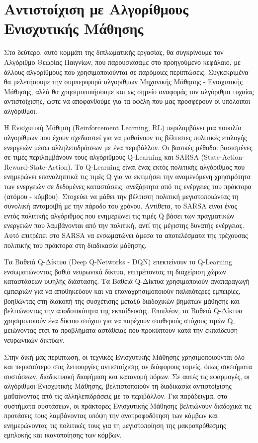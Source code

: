 \chapter{Αντιστοίχιση με Αλγορίθμους Ενισχυτικής Μάθησης}

Στο δεύτερο, αυτό κομμάτι της διπλωματικής εργασίας, θα συγκρίνουμε τον Αλγόριθμο Θεωρίας Παιγνίων, που παρουσιάσαμε στο προηγούμενο κεφάλαιο, με άλλους αλγορίθμους που χρησιμοποιούνται σε παρόμοιες περιπτώσεις. Συγκεκριμένα θα μελετήσουμε την συμπεριφορά αλγορίθμων Μηχανικής Μάθησης - Ενισχυτικής Μάθησης, αλλά θα χρησιμοποιήσουμε και ως σημείο αναφοράς τον αλγόριθμο τυχαίας αντιστοίχισης, ώστε να αποφανθούμε για τα οφέλη που μας προσφέρουν οι υπόλοιποι αλγόριθμοι.

Η Ενισχυτική Μάθηση (Reinforcement Learning, RL) περιλαμβάνει μια ποικιλία αλγορίθμων που έχουν σχεδιαστεί για να μαθαίνουν τις βέλτιστες πολιτικές επιλογής ενεργειών μέσω αλληλεπιδράσεων με ένα περιβάλλον. Οι βασικές μέθοδοι βασισμένες σε τιμές περιλαμβάνουν τους αλγόριθμους Q-Learning και SARSA (State-Action-Reward-State-Action). Το Q-Learning είναι ένας εκτός πολιτικής αλγόριθμος που ενημερώνει επαναληπτικά τις τιμές Q για να εκτιμήσει την αναμενόμενη χρησιμότητα των ενεργειών σε δεδομένες καταστάσεις, ανεξάρτητα από τις ενέργειες του πράκτορα (ατόμου - κόμβου). Στοχεύει να μάθει την βέλτιστη πολιτική μεγιστοποιώντας τη συνολική ανταμοιβή με την πάροδο του χρόνου. Αντίθετα, το SARSA είναι ένας εντός πολιτικής αλγόριθμος που ενημερώνει τις τιμές Q βάσει των πραγματικών ενεργειών που λαμβάνονται από την πολιτική, αντί της μέγιστης δυνατής ενέργειας. Αυτό επιτρέπει στο SARSA να ενσωματώνει άμεσα τα αποτελέσματα της τρέχουσας πολιτικής του πράκτορα στη διαδικασία μάθησης. 

Τα Βαθειά Q-Δίκτυα (Deep Q-Networks - DQN) επεκτείνουν το Q-Learning ενσωματώνοντας βαθιά νευρωνικά δίκτυα, επιτρέποντας τη διαχείριση χώρων καταστάσεων υψηλής διάστασης. Τα Βαθειά Q-Δίκτυα χρησιμοποιούν αναπαραγωγή εμπειριών για να αποθηκεύουν και να επαναχρησιμοποιούν παλαιότερες εμπειρίες, βοηθώντας στη διακοπή της συσχέτισης μεταξύ διαδοχικών βημάτων μάθησης και βελτιώνοντας την αποδοτικότητα της εκπαίδευσης. Επιπλέον, τα Βαθειά Q-Δίκτυα χρησιμοποιούν ένα δίκτυο στόχου για να παρέχουν σταθερούς στόχους τιμών Q, μειώνοντας έτσι τα προβλήματα αστάθειας που προκύπτουν κατά την εκπαίδευση νευρωνικών δικτύων. 

Στην δική μας περίπτωση, οι τεχνικές Ενισχυτικής Μάθησης χρησιμοποιούνται όλο και περισσότερο στις λειτουργίες αντιστοίχισης σε διάφορους τομείς, όπως συστήματα συστάσεων, διαδικτυακή διαφήμιση και κατανομή πόρων. Σε αυτές τις εφαρμογές, οι αλγόριθμοι Ενισχυτικής Μάθησης, βελτιστοποιούν τη διαδικασία αντιστοίχισης μαθαίνοντας από τις αλληλεπιδράσεις με το περιβάλλον. Για παράδειγμα, στα συστήματα συστάσεων, οι πράκτορες Ενισχυτικής Μάθησης βελτιώνουν διαδοχικά τις προτάσεις τους λαμβάνοντας υπόψη την ανατροφοδότηση των κόμβων και ενημερώνοντας τις πολιτικές τους για τη μεγιστοποίηση της μακροπρόθεσμης εμπλοκής και ικανοποίησης των κόμβων. 

